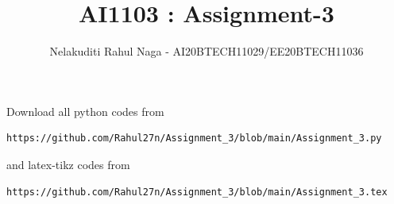 \documentclass[journal,12pt,twocolumn]{IEEEtran}
\DeclareMathOperator*{\Res}{Res}
\begin{document}
\newcommand{\BEQA}{\begin{eqnarray}}
\newcommand{\EEQA}{\end{eqnarray}}
\newcommand{\define}{\stackrel{\triangle}{=}}

\raggedbottom
\setlength{\parindent}{0pt}
\providecommand{\mbf}{\mathbf}
\providecommand{\pr}[1]{\ensuremath{\Pr\left(#1\right)}}
\providecommand{\qfunc}[1]{\ensuremath{Q\left(#1\right)}}
\providecommand{\sbrak}[1]{\ensuremath{{}\left[#1\right]}}
\providecommand{\lsbrak}[1]{\ensuremath{{}\left[#1\right.}}
\providecommand{\rsbrak}[1]{\ensuremath{{}\left.#1\right]}}
\providecommand{\brak}[1]{\ensuremath{\left(#1\right)}}
\providecommand{\lbrak}[1]{\ensuremath{\left(#1\right.}}
\providecommand{\rbrak}[1]{\ensuremath{\left.#1\right)}}
\providecommand{\cbrak}[1]{\ensuremath{\left\{#1\right\}}}
\providecommand{\lcbrak}[1]{\ensuremath{\left\{#1\right.}}
\providecommand{\rcbrak}[1]{\ensuremath{\left.#1\right\}}}
\theoremstyle{remark}
\newtheorem{rem}{Remark}
\newcommand{\sgn}{\mathop{\mathrm{sgn}}}
\providecommand{\abs}[1]{\vert#1\vert}
\providecommand{\res}[1]{\Res\displaylimits_{#1}} 
\providecommand{\norm}[1]{\lVert#1\rVert}
\providecommand{\mtx}[1]{\mathbf{#1}}
\providecommand{\mean}[1]{E[ #1 ]}
\providecommand{\fourier}{\overset{\mathcal{F}}{ \rightleftharpoons}}
\providecommand{\system}{\overset{\mathcal{H}}{ \longleftrightarrow}}
\newcommand{\solution}{\noindent \textbf{Solution: }}
\newcommand{\cosec}{\,\text{cosec}\,}
\providecommand{\dec}[2]{\ensuremath{\overset{#1}{\underset{#2}{\gtrless}}}}
\newcommand{\myvec}[1]{\ensuremath{\begin{pmatrix}#1\end{pmatrix}}}
\newcommand{\mydet}[1]{\ensuremath{\begin{vmatrix}#1\end{vmatrix}}}
\makeatletter
{}
\makeatother
\let\StandardTheFigure\thefigure
\let\vec\mathbf
\renewcommand{\thefigure}{\theproblem}
\def\putbox#1#2#3{\makebox[0in][l]{\makebox[#1][l]{}\raisebox{\baselineskip}[0in][0in]{\raisebox{#2}[0in][0in]{#3}}}}
     \def\rightbox#1{\makebox[0in][r]{#1}}
     \def\centbox#1{\makebox[0in]{#1}}
     \def\topbox#1{\raisebox{-\baselineskip}[0in][0in]{#1}}
     \def\midbox#1{\raisebox{-0.5\baselineskip}[0in][0in]{#1}}
\vspace{3cm}
\title{AI1103 : Assignment-3}
\author{Nelakuditi Rahul Naga - AI20BTECH11029/EE20BTECH11036}
\maketitle
\newpage
\bigskip
\renewcommand{\thefigure}{\theenumi}
\renewcommand{\thetable}{\theenumi}
Download all python codes from 
\begin{lstlisting}
https://github.com/Rahul27n/Assignment_3/blob/main/Assignment_3.py
\end{lstlisting}
%
and latex-tikz codes from 
%
\begin{lstlisting}
https://github.com/Rahul27n/Assignment_3/blob/main/Assignment_3.tex
\end{lstlisting}
\end{document}
